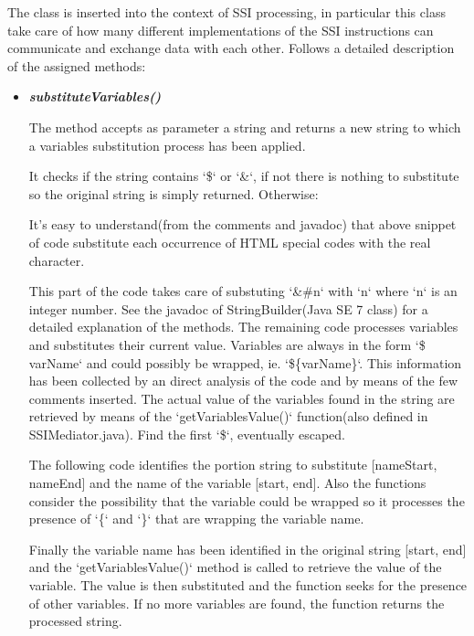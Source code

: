 \documentclass[11pt,titlepage]{article} %
\begin{document}
  The class is inserted into the context of SSI processing, in particular this class take care of
  how many different implementations of the SSI instructions can communicate and exchange data with each other.\newline
  Follows a detailed description of the assigned methods:
  \begin{itemize}
   \item \textbf{\textit{substituteVariables()}}
    
    The method accepts as parameter a string and returns a new string to which a variables substitution process has been applied.
    
    It checks if the string contains `\$` or `\&`, if not there is nothing to substitute so the original string is simply returned.
    Otherwise: 
    
    It's easy to understand(from the comments and javadoc) that above snippet of code substitute each occurrence of HTML special codes with the real character. \newline
    
    This part of the code takes care of substuting `\&\#n` with `n` where `n` is an integer number.
    See the javadoc of StringBuilder(Java SE 7 class) for a detailed explanation of the methods.\newline
    The remaining code processes variables and substitutes their current value.\newline
    Variables are always in the form `\$ varName` and could possibly be wrapped, ie. `\$\{varName\}`. 
    This information has been collected by an direct analysis of the code and by means of the few comments inserted. 
    The actual value of the variables found in the string are retrieved by means of the `getVariablesValue()` function(also defined in SSIMediator.java).\newline
    Find the first `\$`, eventually escaped.
    
    The following code identifies the portion string to substitute [nameStart, nameEnd] and the name of the variable [start, end].
    Also the functions consider the possibility that the variable could be wrapped so it processes the presence of `\{` and `\}` that
    are wrapping the variable name.
    
    Finally the variable name has been identified in the original string [start, end] and the `getVariablesValue()` method is called
    to retrieve the value of the variable. The value is then substituted and the function seeks for the presence of other variables.
    If no more variables are found, the function returns the processed string.
    


  \end{itemize}
\end{document}
